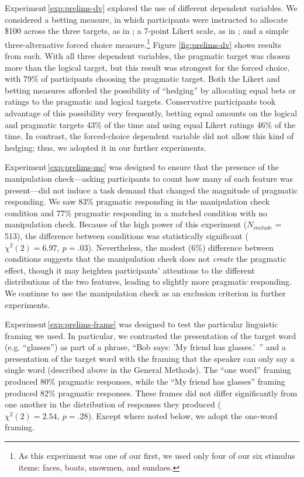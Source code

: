 \documentclass[man,noapacite]{apa2}
\newcounter{Experiment}
\newcommand{\exptref}[1]{Experiment\,\ref{#1}}
\begin{document}
\exptref{exp:prelims-dv} explored the use of different dependent variables. We considered a betting measure, in which participants were instructed to allocate \$100 across the three targets, as in ; a 7-point Likert scale, as in ; and a simple three-alternative forced choice measure.\footnote{As this experiment was one of our first, we used only four of our six stimulus items: faces, boats, snowmen, and sundaes.} Figure \ref{fig:prelims-dv} shows results from each. With all three dependent variables, the pragmatic target was chosen more than the logical target, but this result was strongest for the forced choice, with 79\% of participants choosing the pragmatic target. Both the Likert and betting measures afforded the possibility of ``hedging'' by allocating equal bets or ratings to the pragmatic and logical targets. Conservative participants took advantage of this possibility very frequently, betting equal amounts on the logical and pragmatic targets 43\% of the time and using equal Likert ratings 46\% of the time. In contrast, the forced-choice dependent variable did not allow this kind of hedging; thus, we adopted it in our further experiments.

\exptref{exp:prelims-mc} was designed to ensure that the presence of the manipulation check---asking participants to count how many of each feature was present---did not induce a task demand that changed the magnitude of pragmatic responding. We saw 83\% pragmatic responding in the manipulation check condition and 77\% pragmatic responding in a matched condition with no manipulation check. Because of the high power of this experiment ($N_{include}$ = 513), the difference between conditions was statistically significant ($\chi^2(2) = 6.97,~p = .03$). Nevertheless, the modest (6\%) difference between conditions suggests that the manipulation check does not \emph{create} the pragmatic effect, though it may heighten participants' attentions to the different distributions of the two features, leading to slightly more pragmatic responding. We continue to use the manipulation check as an exclusion criterion in further experiments.

\exptref{exp:prelims-frame} was designed to test the particular linguistic framing we used. In particular, we contrasted the presentation of the target word (e.g. ``glasses'') as part of a phrase, ``Bob says: 'My friend has glasses.'~'' and a presentation of the target word with the framing that the speaker can only say a single word (described above in the General Methods). The ``one word'' framing produced 80\% pragmatic responses, while the ``My friend has glasses'' framing produced 82\% pragmatic responses. These frames did not differ significantly from one another in the distribution of responses they produced ($\chi^2(2) = 2.54,~p = .28$). Except where noted below, we adopt the one-word framing.
\end{document}

